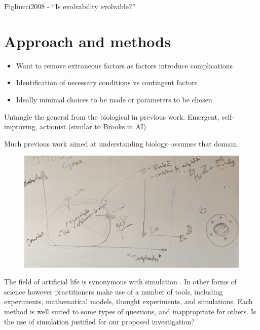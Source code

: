 Pigliucci2008 - ``Is evolvability evolvable?''

\section{Approach and methods}\label{approach}

\begin{itemize}
	\item
	Want to remove extraneous factors as factors introduce complications
	\item
	Identification of necessary conditions vs contingent factors
	\item
	Ideally minimal choices to be made or parameters to be chosen
\end{itemize}

Untangle the general from the biological in previous work. Emergent, self-improving, actionist (similar to Brooks in AI)

Much previous work aimed at understanding biology--assumes that domain.

\begin{figure}
	\begin{center}
		\includegraphics[width=\linewidth]{figures/approach}
	\end{center}
\end{figure}


The field of artificial life is synonymous with simulation
\autocite[chap.2]{Aicardi2010}. In other forms of science however
practitioners make use of a number of tools, including experiments,
mathematical models, thought experiments, and simulations.
Each method is well suited to some types of
questions, and inappropriate for others. Is the use of simulation
justified for our proposed investigation?

